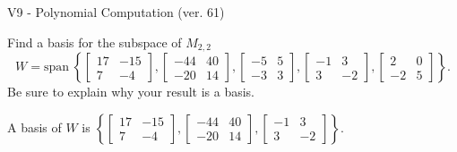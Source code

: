 \begin{exercise}
  \begin{exerciseTitle}V9 - Polynomial Computation (ver. 61)\end{exerciseTitle}
  \begin{exerciseStatement}
    Find a basis for the subspace of \(M_{2,2}\) 
\[W=\mathrm{span}\ \left\{\left[\begin{array}{cc}
17 & -15 \\
7 & -4
\end{array}\right] , \left[\begin{array}{cc}
-44 & 40 \\
-20 & 14
\end{array}\right] , \left[\begin{array}{cc}
-5 & 5 \\
-3 & 3
\end{array}\right] , \left[\begin{array}{cc}
-1 & 3 \\
3 & -2
\end{array}\right] , \left[\begin{array}{cc}
2 & 0 \\
-2 & 5
\end{array}\right]\right\}.\]
 Be sure to explain why your result is a basis.


  \end{exerciseStatement}
  \begin{exerciseAnswer}
   A basis of \(W\) is  \(\left\{\left[\begin{array}{cc}
17 & -15 \\
7 & -4
\end{array}\right] , \left[\begin{array}{cc}
-44 & 40 \\
-20 & 14
\end{array}\right] , \left[\begin{array}{cc}
-1 & 3 \\
3 & -2
\end{array}\right]\right\}\).
  


  \end{exerciseAnswer}
\end{exercise}